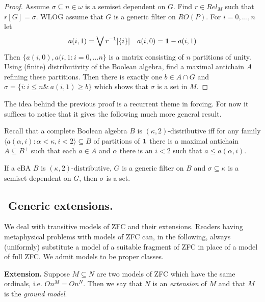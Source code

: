 \begin{proof}
Assume $\sigma\subseteq n\in\omega$ is a semiset dependent on $G$. Find $r\in Rel_M$ such that $r[G]=\sigma$. WLOG assume that $G$ is a generic filter on $RO(P)$. For $i=0,\ldots,n$ let
$$ %
a(i,1)=\bigvee r^{-1}[\{i\}]\quad a(i,0)=\1-a(i,1)
$$ %
Then $\{a(i,0),a(i,1:i=0,\ldots n\}$ is a matrix consisting of $n$ partitions of unity. Using (finite) distributivity of the Boolean algebra, find a maximal
antichain $A$ refining these partitions. Then there is exactly one $b\in A\cap G$ and $\sigma=\{i:i\leq n\&\ a(i,1)\geq b\}$ which shows that $\sigma$ is a set
in $M$.
\end{proof}

The idea behind the previous proof is a recurrent theme in forcing. For now it suffices to notice that it gives the following much more general result.

Recall that a complete Boolean algebra $B$ is $(\kappa,2)$-distributive iff for any family $\langle a(\alpha,i):\alpha<\kappa,i<2\rangle\subseteq B$ of
partitions of $\hbox{\bf 1}$ there is a maximal antichain $A\subseteq B^{+}$ such that each $a\in A$ and $\alpha$ there is an $i<2$ such that $a\leq a(\alpha,i)$.

\begin{fact}
If a cBA $B$ is $(\kappa,2)$-distributive, $G$ is a generic filter on $B$ and $\sigma\subseteq\kappa$ is a semiset dependent on $G$, then $\sigma$ is
a set.
\end{fact}





\subsection{${}$ \hspace{-1em}Generic extensions.}

We deal with transitive models of ZFC and their extensions. Readers having metaphysical problems with models of ZFC can, in the following, always
(uniformly) substitute a model of a suitable fragment of ZFC in place of a model of full ZFC. We admit models to be proper classes.

\begin{definition}\label{extension}{\bf Extension.}
Suppose $M\subseteq N$ are two models of ZFC which have the same ordinals, i.e. $On^M=On^N$. Then we say that
$N$ is an \emph{extension} of $M$ and that $M$ is the \emph{ground model}.
\end{definition}

